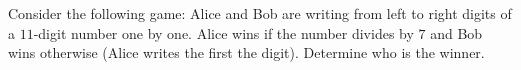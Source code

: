 \documentclass[addpoints,answers]{exam}
\begin{document}
\begin{questions}
        \question
            Consider the following game: Alice and Bob are writing from left to right digits
            of a $11$-digit number one by one. Alice wins if the number divides by $7$ and Bob
            wins otherwise (Alice writes the first the digit). Determine who is the winner.
            \begin{solutionorbox}[\stretch{1}]
            \end{solutionorbox}
            \newpage
 
\end{questions}
\end{document}
